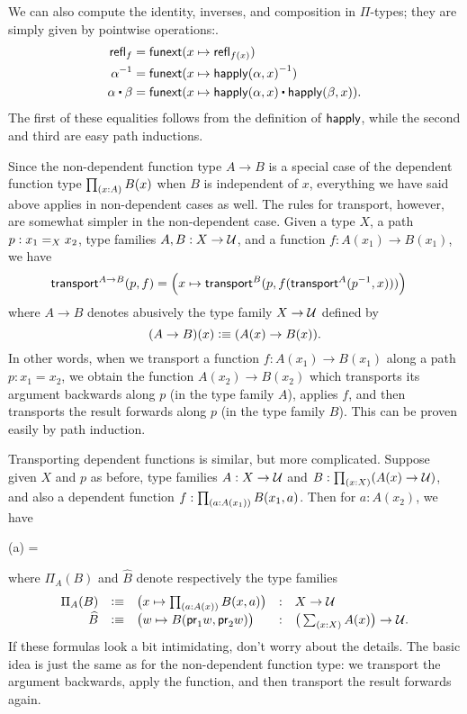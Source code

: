 We can also compute the identity, inverses, and composition in $\Pi$-types; they are simply given by pointwise operations:.
\begin{align*}
\refl{f} &= \funext(x \mapsto \refl{f(x)}) \\
\opp{\alpha} &= \funext (x \mapsto \opp{\happly (\alpha,x)})  \\
{\alpha} \ct \beta &= \funext (x \mapsto {\happly({\alpha},x) \ct \happly({\beta},x)}).
\end{align*}
The first of these equalities follows from the definition of $\happly$, while the second and third are easy path inductions.

Since the non-dependent function type $A\to B$ is a special case of the dependent function type $\prd{x:A} B(x)$ when $B$ is independent of $x$, everything we have said above applies in non-dependent cases as well.
%
The rules for transport, however, are somewhat simpler in the non-dependent case.
Given a type $X$, a path $p:\id[X]{x_1}{x_2}$, type families $A,B:X\to \type$, and a function $f : A(x_1) \to B(x_1)$,  we have
\begin{align}\label{eq:transport-arrow}
  \transfib{A\to B}{p}{f} &=
  \Big(x \mapsto \transfib{B}{p}{f(\transfib{A}{\opp p}{x})}\Big)
\end{align}
where $A\to B$ denotes abusively the type family $X\to \type$ defined by
\[(A\to B)(x) \defeq (A(x)\to B(x)).\]
In other words, when we transport a function $f:A(x_1)\to B(x_1)$ along a path $p:x_1=x_2$, we obtain the function $A(x_2)\to B(x_2)$ which transports its argument backwards along $p$ (in the type family $A$), applies $f$, and then transports the result forwards along $p$ (in the type family $B$).
This can be proven easily by path induction.

%
Transporting dependent functions is similar, but more complicated.
Suppose given $X$ and $p$ as before, type families $A:X\to \type$ and $B:\prd{x:X} (A(x)\to\type)$, and also a dependent function $f : \prd{a:A(x_1)} B(x_1,a)$.
Then for $a:A(x_2)$, we have
\begin{narrowmultline*}
  (a) = \narrowbreak
\end{narrowmultline*}
where $\Pi_A(B)$ and $\widehat{B}$ denote respectively the type families
\begin{equation}\label{eq:transport-arrow-families}
\begin{array}{rclcl}
\Pi_A(B) &\defeq& \big(x\mapsto \prd{a:A(x)} B(x,a) \big) &:& X\to \type\\
\widehat{B} &\defeq& \big(w \mapsto B(\proj1w,\proj2w) \big) &:& \big(\sm{x:X} A(x)\big) \to \type.
\end{array}
\end{equation}
If these formulas look a bit intimidating, don't worry about the details.
The basic idea is just the same as for the non-dependent function type: we transport the argument backwards, apply the function, and then transport the result forwards again.


